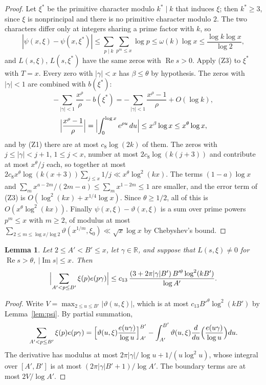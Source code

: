 \documentclass[11pt,a4paper,reqno]{amsart}
\newtheorem{lemma}[theorem]{Lemma}
\theoremstyle{remark}
\numberwithin{equation}{section}
\renewcommand{\Re}{\operatorname{Re}}
\renewcommand{\Im}{\operatorname{Im}}
\newcommand{\R}{\mathbb{R}}
\begin{document}
\begin{proof}
Let $\xi^*$ be the primitive character modulo $k^*\mid k$ that induces $\xi$; then $k^*\ge3$, since $\xi$ is nonprincipal and there is no primitive character modulo $2$. The two characters differ only at integers sharing a prime factor with $k$, so
\[
  |\psi(x,\xi)-\psi(x,\xi^*)|\le\sum_{p\mid k}\sum_{p^m\le x}\log p\le\omega(k)\log x\le\frac{\log k\log x}{\log2},
\]
and $L(s,\xi)$, $L(s,\xi^*)$ have the same zeros with $\Re s>0$. Apply (Z3) to $\xi^*$ with $T=x$. Every zero with $|\gamma|<x$ has $\beta\le\theta$ by hypothesis. The zeros with $|\gamma|<1$ are combined with $b(\xi^*)$:
\[
  -\sum_{|\gamma|<1}\frac{x^\rho}\rho-b(\xi^*)=-\sum_{|\gamma|<1}\frac{x^\rho-1}\rho+O(\log k),
\]
\[
  \Bigl|\frac{x^\rho-1}\rho\Bigr|=\Bigl|\int_0^{\log x}e^{\rho u}\,du\Bigr|\le x^\beta\log x\le x^\theta\log x,
\]
and by (Z1) there are at most $c_8\log(2k)$ of them. The zeros with $j\le|\gamma|<j+1$, $1\le j<x$, number at most $2c_8\log(k(j+3))$ and contribute at most $x^\theta/j$ each, so together at most $2c_8x^\theta\log(k(x+3))\sum_{j\le x}1/j\ll x^\theta\log^2(kx)$. The terms $(1-a)\log x$ and $\sum_mx^{a-2m}/(2m-a)\le\sum_mx^{1-2m}\le1$ are smaller, and the error term of (Z3) is $O(\log^2(kx)+x^{1/4}\log x)$. Since $\theta\ge1/2$, all of this is $O(x^\theta\log^2(kx))$. Finally $\psi(x,\xi)-\vartheta(x,\xi)$ is a sum over prime powers $p^m\le x$ with $m\ge2$, of modulus at most $\sum_{2\le m\le\log x/\log2}\vartheta(x^{1/m},\xi_0)\ll\sqrt x\log x$ by Chebyshev's bound.
\end{proof}

\begin{lemma}\label{lem:pexp}
Let $2\le A'<B'\le x$, let $\gamma\in\R$, and suppose that $L(s,\xi)\ne0$ for $\Re s>\theta$, $|\Im s|\le x$. Then
\[
  \Bigl|\sum_{A'<p\le B'}\xi(p)e(p\gamma)\Bigr|\le c_{13}\,\frac{(3+2\pi|\gamma|B')\,B'^{\theta}\log^2(kB')}{\log A'}.
\]
\end{lemma}

\begin{proof}
Write $V=\max_{2\le u\le B'}|\vartheta(u,\xi)|$, which is at most $c_{13}B'^\theta\log^2(kB')$ by Lemma~\ref{lem:psi}. By partial summation,
\[
  \sum_{A'<p\le B'}\xi(p)e(p\gamma)=\Bigl[\vartheta(u,\xi)\frac{e(u\gamma)}{\log u}\Bigr]_{A'}^{B'}-\int_{A'}^{B'}\vartheta(u,\xi)\frac{d}{du}\Bigl(\frac{e(u\gamma)}{\log u}\Bigr)du .
\]
The derivative has modulus at most $2\pi|\gamma|/\log u+1/(u\log^2u)$, whose integral over $[A',B']$ is at most $(2\pi|\gamma|B'+1)/\log A'$. The boundary terms are at most $2V/\log A'$.
\end{proof}
\end{document}
